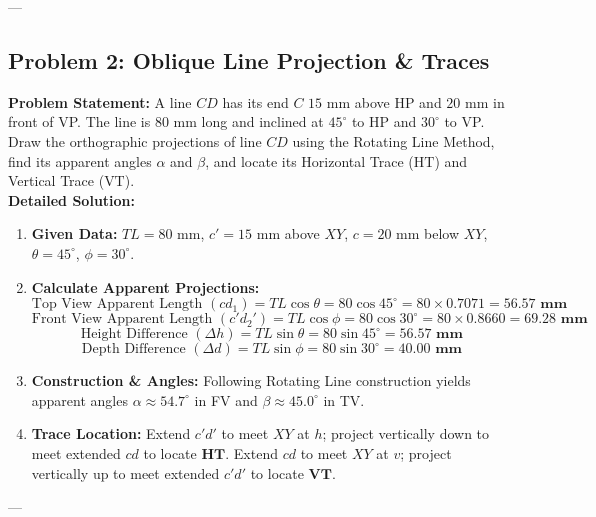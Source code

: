 ---

\subsection{Problem 2: Oblique Line Projection \& Traces}
\textbf{Problem Statement:} A line $CD$ has its end $C$ $15\text{ mm}$ above HP and $20\text{ mm}$ in front of VP. The line is $80\text{ mm}$ long and inclined at $45^\circ$ to HP and $30^\circ$ to VP. Draw the orthographic projections of line $CD$ using the Rotating Line Method, find its apparent angles $\alpha$ and $\beta$, and locate its Horizontal Trace ($\text{HT}$) and Vertical Trace ($\text{VT}$).\\[4pt]
\textbf{Detailed Solution:}
\begin{enumerate}
    \item \textbf{Given Data:} $TL = 80\text{ mm}$, $c' = 15\text{ mm}$ above $XY$, $c = 20\text{ mm}$ below $XY$, $\theta = 45^\circ$, $\phi = 30^\circ$.
    \item \textbf{Calculate Apparent Projections:}
    $$\text{Top View Apparent Length } (c d_1) = TL \cos \theta = 80 \cos 45^\circ = 80 \times 0.7071 = \mathbf{56.57\text{ mm}}$$
    $$\text{Front View Apparent Length } (c' d_2') = TL \cos \phi = 80 \cos 30^\circ = 80 \times 0.8660 = \mathbf{69.28\text{ mm}}$$
    $$\text{Height Difference } (\Delta h) = TL \sin \theta = 80 \sin 45^\circ = \mathbf{56.57\text{ mm}}$$
    $$\text{Depth Difference } (\Delta d) = TL \sin \phi = 80 \sin 30^\circ = \mathbf{40.00\text{ mm}}$$
    \item \textbf{Construction \& Angles:} Following Rotating Line construction yields apparent angles $\alpha \approx \mathbf{54.7^\circ}$ in FV and $\beta \approx \mathbf{45.0^\circ}$ in TV.
    \item \textbf{Trace Location:} Extend $c'd'$ to meet $XY$ at $h$; project vertically down to meet extended $cd$ to locate $\mathbf{\text{HT}}$. Extend $cd$ to meet $XY$ at $v$; project vertically up to meet extended $c'd'$ to locate $\mathbf{\text{VT}}$.
\end{enumerate}

---

